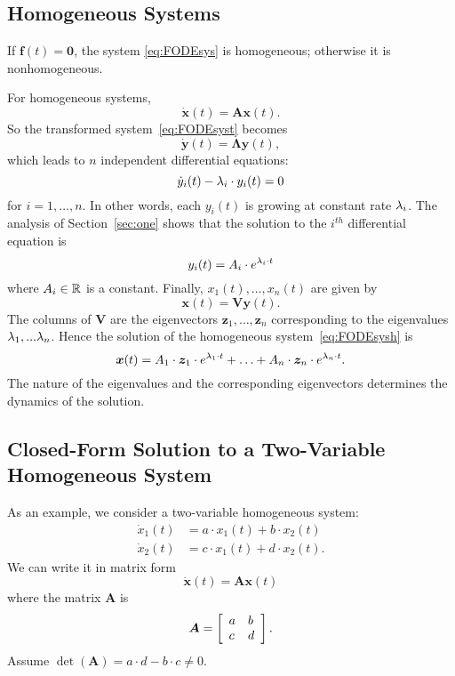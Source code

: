 \documentclass[letterpaper,12pt,leqno]{article}
\begin{document}
\subsection{Homogeneous Systems}

If $\bm{f}(t) =\bm{0}$, the system \eqref{eq:FODEsys} is homogeneous; otherwise it is nonhomogeneous. 

For homogeneous systems, 
\begin{equation}
\bm{\dot{x}}(t) =\bm{A} \bm{x}(t).\label{eq:FODEsysh}
\end{equation}
So the transformed system~\eqref{eq:FODEsyst} becomes 
\begin{equation*}
\bm{\dot{y}}(t) =\bm{\Lambda}\bm{y}(t) ,
\end{equation*}
which leads to $n$ independent differential equations:
\begin{equation*}
\dot{y}_{i}(t) -\lambda_{i} \cdot y_{i}(t)=0
\end{equation*}
for $i=1,\ldots,n$. In other words, each $y_{i}(t) $ is growing at constant rate $\lambda_{i}$. The analysis of Section~\ref{sec:one} shows that the solution to the $i^{th}$ differential equation is 
\begin{equation*}
y_{i}(t) =A_{i}\cdot e^{\lambda_{i}\cdot t}
\end{equation*}
where $A_{i}\in \mathbb{R}$ is a constant. Finally, $x_{1}(t),\ldots,x_{n}(t)$ are given by
\begin{equation*}
\bm{x}(t) =\bm{V} \bm{y}(t) .
\end{equation*}
The columns of $\bm{V}$ are the eigenvectors $\bm{z}_{1},\ldots,\bm{z}_{n}$ corresponding to the
eigenvalues $\lambda_{1},...\lambda_{n}$. Hence the solution of the homogeneous system~\eqref{eq:FODEsysh} is 
\begin{equation}
\bm{x}(t) =A_{1}\cdot \bm{z}_{1} \cdot e^{\lambda_{1}\cdot t}+\ldots+A_{n}\cdot \bm{z}_{n}\cdot e^{\lambda_{n}\cdot t}.\label{eq:SOLEV}
\end{equation}
The nature of the eigenvalues and the corresponding eigenvectors determines
the dynamics of the solution. 

\subsection{Closed-Form Solution to a Two-Variable Homogeneous System}

As an example, we consider a two-variable homogeneous system:
\begin{align*}
\dot{x}_{1}(t) &=a\cdot x_{1}(t)+b\cdot x_{2}(t) \\
\dot{x}_{2}(t) &=c\cdot x_{1}(t)+d\cdot x_{2}(t).
\end{align*}
We can write it in matrix form
\begin{equation*}
\bm{\dot{x}}(t) =\bm{A} \bm{x}(t)
\end{equation*}
where the matrix $\bm{A}$ is 
\begin{equation*}
\bm{A}=\left[ 
\begin{array}{ll}
a & b \\ 
c & d
\end{array} \right].
\end{equation*}
Assume $\det(\bm{A}) =a\cdot d-b\cdot c\neq 0. $
\end{document}
